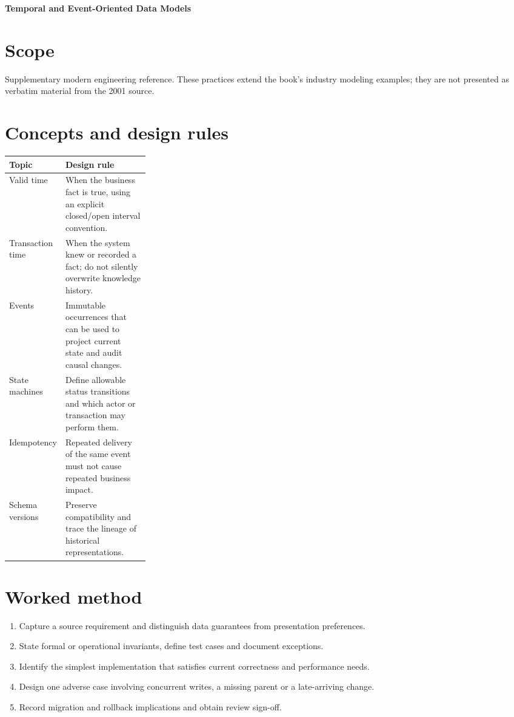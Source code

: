\documentclass[11pt,letterpaper]{article}
\begin{document}
\begin{center}
{\LARGE\bfseries\color{navy} Temporal and Event-Oriented Data Models}\par
\vspace{0.25em}{\large Supplementary technical reference}\par
{}
\end{center}
\vspace{0.8em}
\section{Scope}
Supplementary modern engineering reference. These practices extend the book's industry modeling examples; they are not presented as verbatim material from the 2001 source.


\section{Concepts and design rules}
\begin{tabularx}{\linewidth}{@{}>{\raggedright\arraybackslash}p{0.27\linewidth}>{\raggedright\arraybackslash}X@{}}
\toprule
\textbf{Topic} & \textbf{Design rule} \\ 
\midrule
Valid time & When the business fact is true, using an explicit closed/open interval convention. \\ 
Transaction time & When the system knew or recorded a fact; do not silently overwrite knowledge history. \\ 
Events & Immutable occurrences that can be used to project current state and audit causal changes. \\ 
State machines & Define allowable status transitions and which actor or transaction may perform them. \\ 
Idempotency & Repeated delivery of the same event must not cause repeated business impact. \\ 
Schema versions & Preserve compatibility and trace the lineage of historical representations. \\ 
\bottomrule
\end{tabularx}

\section{Worked method}
\begin{enumerate}
\item Capture a source requirement and distinguish data guarantees from presentation preferences.
\item State formal or operational invariants, define test cases and document exceptions.
\item Identify the simplest implementation that satisfies current correctness and performance needs.
\item Design one adverse case involving concurrent writes, a missing parent or a late-arriving change.
\item Record migration and rollback implications and obtain review sign-off.
\end{enumerate}
\end{document}
